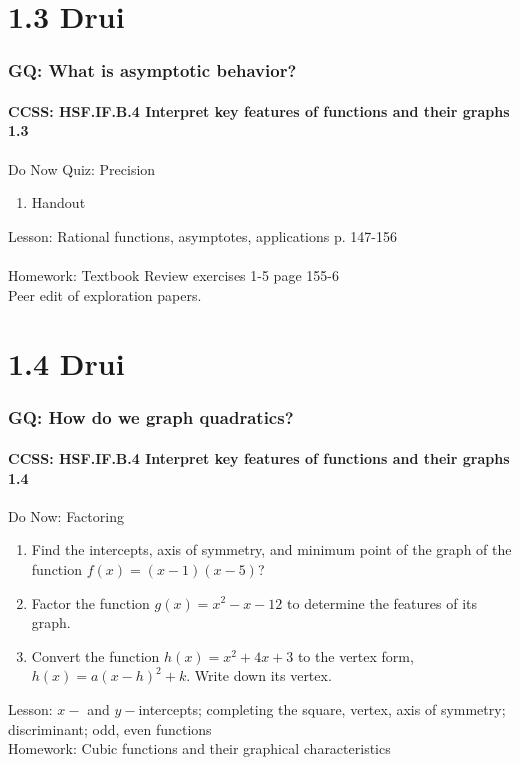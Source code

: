 \documentclass{beamer}
\begin{document}
  \section{1.3 Drui}
  \frame
  {
    \frametitle{GQ: What is asymptotic behavior?}
    \framesubtitle{CCSS: HSF.IF.B.4 Interpret key features of functions and their graphs   \alert{1.3}}

    \begin{block}{Do Now Quiz: Precision}
    \begin{enumerate}
        \item Handout
    \end{enumerate}
    \end{block}
    Lesson: Rational functions, asymptotes, applications p. 147-156\\ [calculator graphing example]
    \\[10pt]
    Homework: Textbook Review exercises 1-5 page 155-6\\[10pt]
    Peer edit of exploration papers.
  }

  \section{1.4 Drui}
  \frame
  {
    \frametitle{GQ: How do we graph quadratics?}
    \framesubtitle{CCSS: HSF.IF.B.4 Interpret key features of functions and their graphs   \alert{1.4}}

    \begin{block}{Do Now: Factoring}
    \begin{enumerate}
        \item Find the intercepts, axis of symmetry, and minimum point of the graph of the function $f(x)=(x-1)(x-5)$?
        \item Factor the function $g(x)=x^2-x-12$ to determine the features of its graph.
        \item Convert the function $h(x)=x^2+4x+3$ to the vertex form, $h(x)=a(x-h)^2+k$. Write down its vertex.
    \end{enumerate}
    \end{block}
    Lesson: $x-$ and $y-$intercepts; completing the square, vertex, axis of symmetry; discriminant; odd, even functions
    \\%
    Homework: Cubic functions and their graphical characteristics
  }
\end{document}
